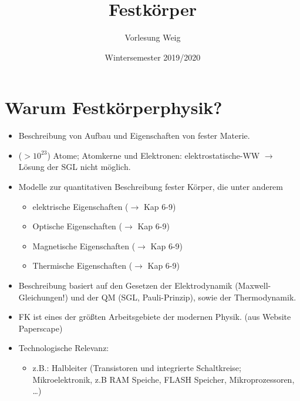 


\title{Festkörper}
\author{Vorlesung Weig}
\date{Wintersemester 2019/2020}



\maketitle \newpage
\tableofcontents
\newpage

\section*{Warum Festkörperphysik?}
	\begin{itemize}
	    \item Beschreibung von Aufbau und Eigenschaften von fester Materie.
	    \item ($>10^{23}$) Atome; Atomkerne und Elektronen: elektrostatische-WW $ \rightarrow $ Lösung der SGL nicht möglich.
	    \item Modelle zur quantitativen Beschreibung fester Körper, die unter anderem
	    \begin{itemize}
	        \item elektrische Eigenschaften ($\rightarrow$ Kap 6-9)%
	        \item Optische Eigenschaften ($\rightarrow$ Kap 6-9)%
	        \item Magnetische Eigenschaften ($\rightarrow$ Kap 6-9)%
	        \item Thermische Eigenschaften ($\rightarrow$ Kap 6-9)%
	    \end{itemize}
	    \item Beschreibung basiert auf den Gesetzen der Elektrodynamik (Maxwell-Gleichungen!) und der QM (SGL, Pauli-Prinzip), sowie der Thermodynamik.
	    \item FK ist eines der größten Arbeitsgebiete der modernen Physik. (aus Website Paperscape)
	    \item Technologische Relevanz:
	    \begin{itemize}
	        \item z.B.: Halbleiter (Transistoren und integrierte Schaltkreise; Mikroelektronik, z.B RAM Speiche, FLASH Speicher, Mikroprozessoren, \dots)

\end{itemize}
\end{itemize}
